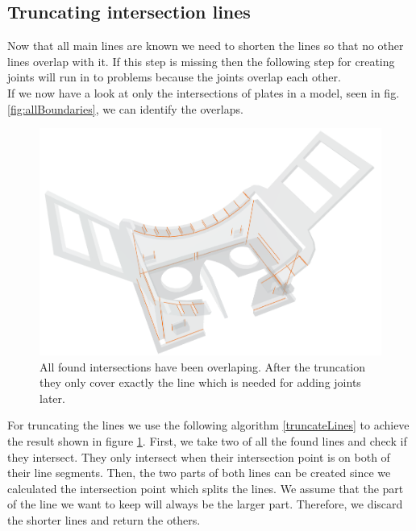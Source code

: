 \documentclass[../ClassicThesis.tex]{subfiles}
\begin{document}
\subsection{Truncating intersection lines}
Now that all main lines are known we need to shorten the lines so that no other lines overlap with it. If this step is missing then the following step for creating joints will run in to problems because the joints overlap each other.\\
If we now have a look at only the intersections of plates in a model, seen in fig. \ref{fig:allBoundaries}, we can identify the overlaps.
\begin{figure}[!ht]
\centering
\includegraphics[width=\columnwidth]{Images/TruncatedIntersectionsHMD.png}
\caption{All found intersections have been overlaping. After the truncation they only cover exactly the line which is needed for adding joints later.}
\label{fig:innerBoundaries}
\end{figure}
For truncating the lines we use the following algorithm \ref{truncateLines} to achieve the result shown in figure \ref{fig:innerBoundaries}.
First, we take two of all the found lines and check if they intersect. They only intersect when their intersection point is on both of their line segments. Then, the two parts of both lines can be created since we calculated the intersection point which splits the lines. We assume that the part of the line we want to keep will always be the larger part. Therefore, we discard the shorter lines and return the others.\\
\end{document}
